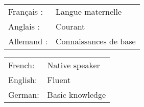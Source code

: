 \ifFrench
  \color{deepgray}
  \small
  \begin{tabular}{@{}ll@{}}
    Français : & Langue maternelle     \\
    Anglais :  & Courant               \\
    Allemand : & Connaissances de base
  \end{tabular}
\else
  \color{deepgray}
  \small
  \begin{tabular}{@{}ll@{}}
    French:  & Native speaker  \\
    English: & Fluent          \\
    German:  & Basic knowledge
  \end{tabular}
\fi